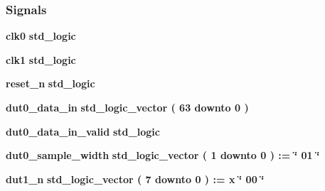 \subsubsection*{Signals}
 \begin{DoxyCompactItemize}
\item 
{\bf clk0} {\bfseries \textcolor{comment}{std\+\_\+logic}\textcolor{vhdlchar}{ }} 
\item 
{\bf clk1} {\bfseries \textcolor{comment}{std\+\_\+logic}\textcolor{vhdlchar}{ }} 
\item 
{\bf reset\+\_\+n} {\bfseries \textcolor{comment}{std\+\_\+logic}\textcolor{vhdlchar}{ }} 
\item 
{\bf dut0\+\_\+data\+\_\+in} {\bfseries \textcolor{comment}{std\+\_\+logic\+\_\+vector}\textcolor{vhdlchar}{ }\textcolor{vhdlchar}{(}\textcolor{vhdlchar}{ }\textcolor{vhdlchar}{ } \textcolor{vhdldigit}{63} \textcolor{vhdlchar}{ }\textcolor{keywordflow}{downto}\textcolor{vhdlchar}{ }\textcolor{vhdlchar}{ } \textcolor{vhdldigit}{0} \textcolor{vhdlchar}{ }\textcolor{vhdlchar}{)}\textcolor{vhdlchar}{ }} 
\item 
{\bf dut0\+\_\+data\+\_\+in\+\_\+valid} {\bfseries \textcolor{comment}{std\+\_\+logic}\textcolor{vhdlchar}{ }} 
\item 
{\bf dut0\+\_\+sample\+\_\+width} {\bfseries \textcolor{comment}{std\+\_\+logic\+\_\+vector}\textcolor{vhdlchar}{ }\textcolor{vhdlchar}{(}\textcolor{vhdlchar}{ }\textcolor{vhdlchar}{ } \textcolor{vhdldigit}{1} \textcolor{vhdlchar}{ }\textcolor{keywordflow}{downto}\textcolor{vhdlchar}{ }\textcolor{vhdlchar}{ } \textcolor{vhdldigit}{0} \textcolor{vhdlchar}{ }\textcolor{vhdlchar}{)}\textcolor{vhdlchar}{ }\textcolor{vhdlchar}{ }\textcolor{vhdlchar}{ }\textcolor{vhdlchar}{\+:}\textcolor{vhdlchar}{=}\textcolor{vhdlchar}{ }\textcolor{vhdlchar}{ }\textcolor{vhdlchar}{ }\textcolor{vhdlchar}{ }\textcolor{keyword}{\char`\"{} 01 \char`\"{}}\textcolor{vhdlchar}{ }} 
\item 
{\bf dut1\+\_\+n} {\bfseries \textcolor{comment}{std\+\_\+logic\+\_\+vector}\textcolor{vhdlchar}{ }\textcolor{vhdlchar}{(}\textcolor{vhdlchar}{ }\textcolor{vhdlchar}{ } \textcolor{vhdldigit}{7} \textcolor{vhdlchar}{ }\textcolor{keywordflow}{downto}\textcolor{vhdlchar}{ }\textcolor{vhdlchar}{ } \textcolor{vhdldigit}{0} \textcolor{vhdlchar}{ }\textcolor{vhdlchar}{)}\textcolor{vhdlchar}{ }\textcolor{vhdlchar}{ }\textcolor{vhdlchar}{ }\textcolor{vhdlchar}{\+:}\textcolor{vhdlchar}{=}\textcolor{vhdlchar}{ }\textcolor{vhdlchar}{ }\textcolor{vhdlchar}{x}\textcolor{vhdlchar}{ }\textcolor{keyword}{\char`\"{} 00 \char`\"{}}\textcolor{vhdlchar}{ }} 

\end{DoxyCompactItemize}
